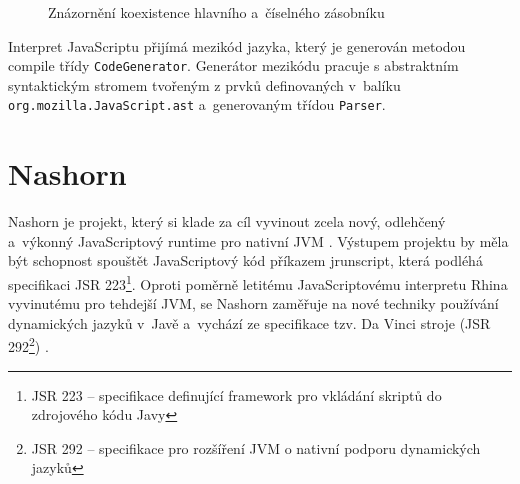 \begin{figure}[H]
  \begin{center}
    \caption{Znázornění koexistence hlavního a~číselného zásobníku}
    \label{Figure.RhinoStack}
  \end{center}
\end{figure}

Interpret JavaScriptu přijímá mezikód jazyka, který je generován metodou compile třídy \texttt{CodeGenerator}. Generátor mezikódu pracuje s abstraktním syntaktickým stromem tvořeným z prvků definovaných v~balíku \texttt{org.mozilla.JavaScript.ast} a~generovaným třídou \texttt{Parser}.

\section{Nashorn}
\label{Chapter.JavaScriptInJavaAnalysis.Nashorn}

Nashorn je projekt, který si klade za cíl vyvinout zcela nový, odlehčený a~výkonný JavaScriptový runtime pro nativní JVM \cite{Bibliography.Nashorn.Project}. Výstupem projektu by měla být schopnost spouštět JavaScriptový kód příkazem jrunscript, která podléhá specifikaci JSR 223\footnote{JSR 223 -- specifikace definující framework pro vkládání skriptů do zdrojového kódu Javy}. Oproti poměrně letitému JavaScriptovému interpretu Rhina vyvinutému pro tehdejší JVM, se Nashorn zaměřuje na nové techniky používání dynamických jazyků v~Javě a~vychází ze specifikace \linebreak tzv. Da Vinci stroje (JSR 292\footnote{JSR 292 -- specifikace pro rozšíření JVM o nativní podporu dynamických jazyků}) \cite{Bibliography.Nashorn.Project}.

